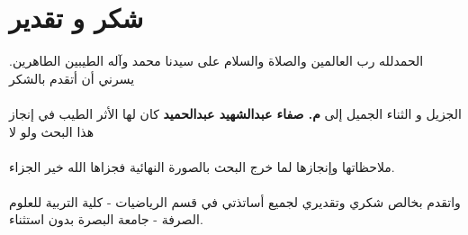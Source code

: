 \chapter*{شكر و تقدير}

الحمدلله رب العالمين والصلاة والسلام على سيدنا محمد وآله الطيبين الطاهرين. يسرني أن أتقدم بالشكر\\ \\ الجزيل و الثناء الجميل إلى \textbf{م. صفاء عبدالشهيد عبدالحميد} كان لها الأثر الطيب في إنجاز هذا البحث ولو لا\\ \\ ملاحظاتها وإنجازها لما خرج البحث بالصورة النهائية فجزاها الله خير الجزاء.\\
\\
واتقدم بخالص شكري وتقديري لجميع أساتذتي في قسم الرياضيات - كلية التربية للعلوم الصرفة - جامعة البصرة بدون استثناء.
